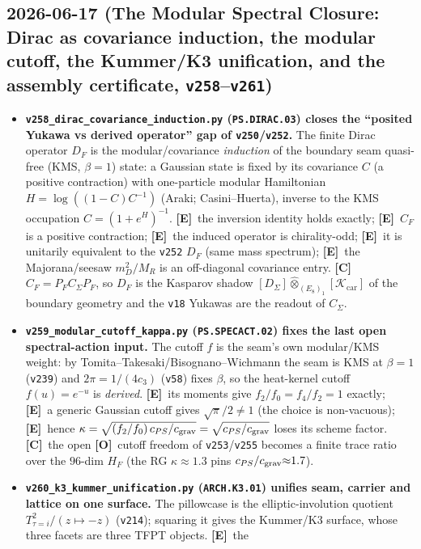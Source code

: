 \documentclass[11pt]{article}
\providecommand{\mE}{\textbf{[E]}}\providecommand{\mC}{\textbf{[C]}}
\providecommand{\mO}{\textbf{[O]}}\providecommand{\mX}{\textbf{[X]}}
\providecommand{\vref}[1]{\texttt{#1}}
\begin{document}
\subsection*{2026-06-17 (The Modular Spectral Closure: Dirac as covariance induction, the modular cutoff, the Kummer/K3 unification, and the assembly certificate, \texttt{v258}--\texttt{v261})}
\begin{itemize}
\item \textbf{\texttt{v258\_dirac\_covariance\_induction.py} (\texttt{PS.DIRAC.03}) closes the
  ``posited Yukawa vs derived operator'' gap of \vref{v250}/\vref{v252}.} The finite Dirac operator $D_F$
  is the modular/covariance \emph{induction} of the boundary seam quasi-free (KMS, $\beta{=}1$) state: a
  Gaussian state is fixed by its covariance $C$ (a positive contraction) with one-particle modular
  Hamiltonian $H=\log((1{-}C)C^{-1})$ (Araki; Casini--Huerta), inverse to the KMS occupation
  $C=(1{+}e^{H})^{-1}$. \mE\ the inversion identity holds exactly; \mE\ $C_F$ is a positive contraction;
  \mE\ the induced operator is chirality-odd; \mE\ it is unitarily equivalent to the \vref{v252} $D_F$ (same
  mass spectrum); \mE\ the Majorana/seesaw $m_D^2/M_R$ is an off-diagonal covariance entry. \mC\
  $C_F=P_F C_\Sigma P_F$, so $D_F$ is the Kasparov shadow $[D_\Sigma]\widehat\otimes_{(E_8)_1}[\mathcal
  K_{\mathrm{car}}]$ of the boundary geometry and the \vref{v18} Yukawas are the readout of $C_\Sigma$.
\item \textbf{\texttt{v259\_modular\_cutoff\_kappa.py} (\texttt{PS.SPECACT.02}) fixes the last open
  spectral-action input.} The cutoff $f$ is the seam's own modular/KMS weight: by
  Tomita--Takesaki/Bisognano--Wichmann the seam is KMS at $\beta{=}1$ (\vref{v239}) and $2\pi{=}1/(4c_3)$
  (\vref{v58}) fixes $\beta$, so the heat-kernel cutoff $f(u)=e^{-u}$ is \emph{derived}. \mE\ its moments
  give $f_2/f_0=f_4/f_2=1$ exactly; \mE\ a generic Gaussian cutoff gives $\sqrt\pi/2\neq1$ (the choice is
  non-vacuous); \mE\ hence $\kappa=\sqrt{(f_2/f_0)\,c_{PS}/c_{\rm grav}}=\sqrt{c_{PS}/c_{\rm grav}}$ loses
  its scheme factor. \mC\ the open \mO\ cutoff freedom of \vref{v253}/\vref{v255} becomes a finite trace
  ratio over the $96$-dim $H_F$ (the RG $\kappa{\approx}1.3$ pins $c_{PS}/c_{\rm grav}{\approx}1.7$).
\item \textbf{\texttt{v260\_k3\_kummer\_unification.py} (\texttt{ARCH.K3.01}) unifies seam, carrier and
  lattice on one surface.} The pillowcase is the elliptic-involution quotient $T^2_{\tau=i}/(z{\mapsto}{-}z)$
  (\vref{v214}); squaring it gives the Kummer/K3 surface, whose three facets are three TFPT objects. \mE\ the

\end{itemize}
\end{document}
